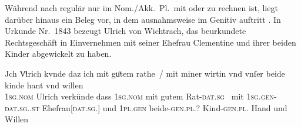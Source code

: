 

\label{phsec:beidegen}
Während nach \citet[623]{ksw2} regulär nur im Nom./Akk.~Pl.\ mit 
oder  zu rechnen ist, liegt darüber hinaus ein Beleg vor, in dem
 ausnahmsweise im Genitiv auftritt . In Urkunde
Nr.~1843 \autocite[146,11--47]{cao3} bezeugt Ulrich von Wichtrach, das
beurkundete Rechtsgeschäft in Einvernehmen mit seiner Ehefrau Clementine und
ihrer beiden Kinder abgewickelt zu haben.

\begin{exe}
\ex\label{ex:1843_kinde}
	\gll Jch Vͦlrich \textelp{} kvnde \textelp{} daz ich mit guͦtem rathe~/
	mit miner wirtin \textelp{} vnd vnſer beide kinde hant
			vnd willen \\
		\textsc{1sg\subM.nom} Ulrich {} verkünde {} dass \textsc{1sg\subM.nom}
			mit gutem Rat-\textsc{dat.sg}~{} mit
			\textsc{1sg\subM.gen-dat.sg.\FemF.st}
			Ehefrau[\textsc{dat.sg.\FemF}] {} und \textsc{1pl\subMF.gen}
			beide-\textsc{gen.pl.?} Kind-\textsc{gen.pl.\NeutA} Hand und
			Willen \\
	\trans {}
		\parencites(Nr.~1843, Thun, Kt.~Bern, 1293)[146,11--13]{cao3}
\end{exe}

